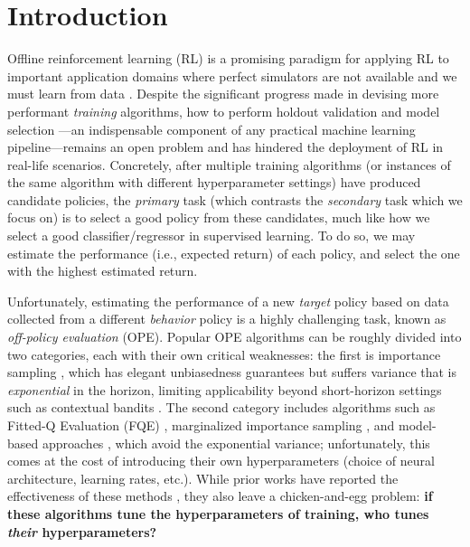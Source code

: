 \section{Introduction}

Offline reinforcement learning (RL) is a promising paradigm for applying RL to important application domains where perfect simulators are not available and we must learn from data \cite{levine2020offline, jiang2024offline}. Despite the significant progress made in devising more performant \textit{training} algorithms, how to perform holdout validation and model selection%
---an indispensable component of any practical machine learning pipeline---remains an open problem and has hindered the deployment of RL in real-life scenarios. 
Concretely, after multiple training algorithms (or instances of the same algorithm with different hyperparameter settings) have produced candidate policies, the \textit{primary} task (which contrasts the \textit{secondary} task which we focus on) is to select a good policy from these candidates, much like how we select a good classifier/regressor in supervised learning. To do so, we may estimate the performance (i.e., expected return) of each policy, and select the one with the highest estimated return. 

Unfortunately, estimating the performance of a new \textit{target} policy based on   data collected from a different \textit{behavior} policy is a highly challenging task, known as \textit{off-policy evaluation} (OPE). Popular OPE algorithms can be roughly divided into two categories, each with their own critical weaknesses: the first is importance sampling \cite{precup2000eligibility,jiang2016doubly,thomas2016data}, which has elegant unbiasedness guarantees but suffers variance that is \textit{exponential} in the horizon, limiting applicability beyond short-horizon settings such as contextual bandits \cite{li2011unbiased}. The second category includes algorithms such as Fitted-Q Evaluation (FQE) \cite{ernst2005tree, le2019batch, paine2020hyperparameter}, marginalized importance sampling \cite{liu2018breaking, nachum2019dualdice, uehara2019minimax}, and model-based approaches \cite{voloshin2021minimax}, which avoid the exponential variance; unfortunately, this comes at the cost of introducing their own hyperparameters (choice of neural architecture, learning rates, etc.). While prior works have reported the effectiveness of these methods \cite{paine2020hyperparameter}, they also leave a chicken-and-egg problem: \textbf{if these algorithms tune the hyperparameters of training, who tunes \textit{their} hyperparameters?} 

